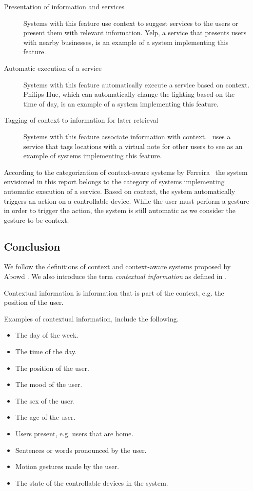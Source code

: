 \begin{description}
\item[Presentation of information and services] Systems with this feature use context to suggest services to the users or present them with relevant information. Yelp, a service that presents users with nearby businesses, is an example of a system implementing this feature.
\item[Automatic execution of a service] Systems with this feature automatically execute a service based on context. Philips Hue, which can automatically change the lighting based on the time of day, is an example of a system implementing this feature.
\item[Tagging of context to information for later retrieval] Systems with this feature associate information with context.~\cite{ferreira2014distributed} uses a service that tags locations with a virtual note for other users to see as an example of systems implementing this feature.
\end{description}

According to the categorization of context-aware systems by Ferreira \etal~the system envisioned in this report belongs to the category of systems implementing automatic execution of a service. Based on context, the system automatically triggers an action on a controllable device. While the user must perform a gesture in order to trigger the action, the system is still automatic as we consider the gesture to be context.

\subsection{Conclusion}

We follow the definitions of context and context-aware systems proposed by Abowd \etal. We also introduce the term \emph{contextual information} as defined in . 

\begin{definition}
\label{def:contextual-information}
Contextual information is information that is part of the context, e.g. the position of the user.
\end{definition}

Examples of contextual information, include the following.

\begin{itemize}
\item The day of the week.
\item The time of the day.
\item The position of the user.
\item The mood of the user.
\item The sex of the user.
\item The age of the user.
\item Users present, e.g. users that are home.
\item Sentences or words pronounced by the user.
\item Motion gestures made by the user.
\item The state of the controllable devices in the system.
\end{itemize}

